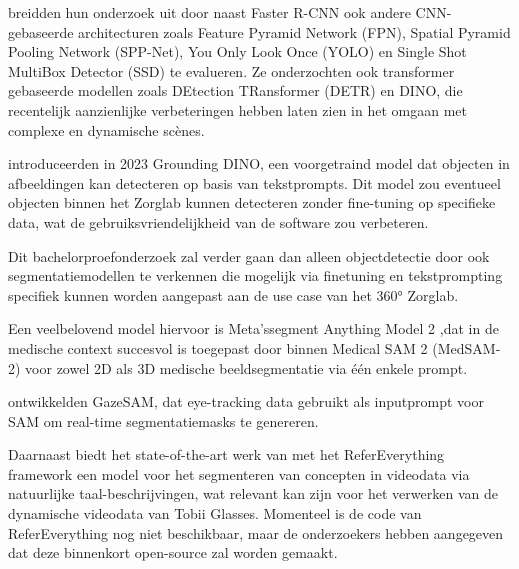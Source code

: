 \textcite{CederinBremberg2023} breidden hun onderzoek uit door 
naast Faster R-CNN ook andere CNN-gebaseerde architecturen zoals Feature Pyramid Network (FPN), Spatial Pyramid Pooling Network (SPP-Net), 
You Only Look Once (YOLO) en Single Shot MultiBox Detector (SSD) te evalueren. 
Ze onderzochten ook transformer gebaseerde modellen zoals DEtection TRansformer (DETR) en DINO, 
die recentelijk aanzienlijke verbeteringen hebben laten zien in het omgaan met complexe en dynamische scènes.
\par
\textcite{liu2023grounding} introduceerden in 2023 Grounding DINO, een voorgetraind model dat objecten in afbeeldingen kan detecteren op basis van tekstprompts.
Dit model zou eventueel objecten binnen het Zorglab kunnen detecteren zonder fine-tuning op specifieke data, wat de gebruiksvriendelijkheid van de software zou verbeteren.
\par
Dit bachelorproefonderzoek zal verder gaan dan alleen objectdetectie door ook segmentatiemodellen te verkennen 
die mogelijk via finetuning en tekstprompting specifiek kunnen worden aangepast aan de use case van het 360° Zorglab. 

Een veelbelovend model hiervoor is Meta’s\newline segment Anything Model 2 \autocite{Ravi2024},\newline dat in de medische context succesvol is toegepast door \textcite{Zhu2024}
binnen Medical SAM 2 (MedSAM-2) voor zowel 2D als 3D medische beeldsegmentatie via één enkele prompt. 

\textcite{Wang2023} ontwikkelden GazeSAM, dat eye-tracking 
data gebruikt als inputprompt voor SAM om real-time segmentatiemasks te genereren.

Daarnaast biedt het state-of-the-art werk van \textcite{Bagchi2024} met het ReferEverything framework een model voor het segmenteren van concepten in 
videodata via natuurlijke taal-\newline beschrijvingen, wat relevant kan zijn voor het verwerken van de dynamische videodata van Tobii Glasses.
Momenteel is de code van ReferEverything nog niet beschikbaar, maar de onderzoekers hebben aangegeven dat deze binnenkort open-source zal worden gemaakt.


